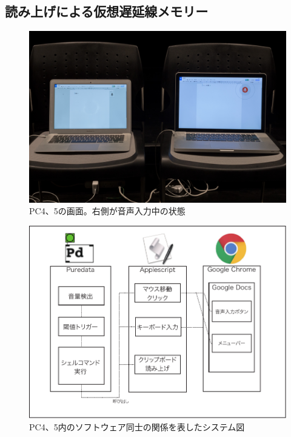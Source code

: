 \documentclass[a4paper,report]{jsbook}
\begin{document}
\subsection{読み上げによる仮想遅延線メモリー}\label{ux8aadux307fux4e0aux3052ux306bux3088ux308bux4eeeux60f3ux9045ux5ef6ux7ddaux30e1ux30e2ux30eaux30fc}

\begin{no-prefix-figure-caption}

\begin{figure}[htbp]
\centering
\includegraphics[width=1.00000\textwidth]{./img/adm2_archive2.jpg}
\caption{PC4、5の画面。右側が音声入力中の状態}
\end{figure}

\end{no-prefix-figure-caption}

\begin{figure}[htbp]
\centering
\includegraphics[width=1.00000\textwidth]{./img/yomiage_diagram.pdf}
\caption{PC4、5内のソフトウェア同士の関係を表したシステム図\label{fig:yomiage}}
\end{figure}
\end{document}
